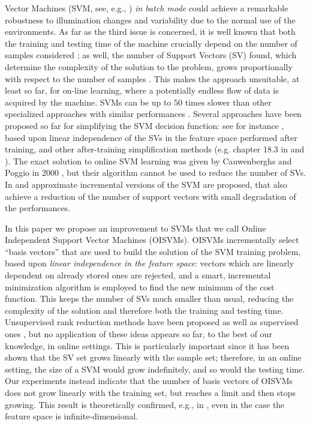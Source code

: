 Vector Machines (SVM, see, e.g., \cite{BGV92}) \emph{in batch mode}
could achieve a remarkable robustness to illumination changes and
variability due to the normal use of the environments. As far as the
third issue is concerned, it is well known that both the training and
testing time of the machine crucially depend on the number of samples
considered \cite{KeerthiCDC06}; as well, the number of Support Vectors
(SV) found, which determine the complexity of the solution to the
problem, grows proportionally with respect to the number of samples
\cite{Steinwart03}. This makes the approach unsuitable, at least so
far, for on-line learning, where a potentially endless flow of data is
acquired by the machine. SVMs can be up to $50$ times slower than
other specialized approaches with similar performances
\cite{BurgesS96}.
Several approaches have been proposed so far for simplifying the SVM decision function: see for instance
\cite{DownsGM01}, based upon linear independence of the SVs in the
feature space performed after training, and other after-training simplification methods (e.g. 
chapter 18.3 in \cite{SmolaS02} and \cite{nguyen2005}).
The exact
solution to online SVM learning was given by Cauwenberghs and Poggio
in 2000 \cite{CauwenberghsP00}, but their algorithm cannot be used to
reduce the number of SVs. In \cite{syed99incremental} and
\cite{pronobis:icvs06} approximate incremental
versions of the SVM are proposed, that also achieve a reduction of the
number of support vectors with small degradation of the performances.

In this paper we propose an improvement to SVMs that we call Online
Independent Support Vector Machines (OISVMs). OISVMs incrementally
select ``basis vectors'' that are used to build the solution of the
SVM training problem, based upon \emph{linear independence in the
feature space}: vectors which are linearly dependent on already stored
ones are rejected, and a smart, incremental minimization algorithm is
employed to find the new minimum of the cost function. This keeps the
number of SVs much smaller than usual, reducing the complexity of the
solution and therefore both the training and testing time. 
Unsupervised rank reduction methods have been proposed
\cite{Baudat03} as well as supervised ones \cite{BachJordan2005}, but
no application of these ideas appears so far, to the best of our
knowledge, in online settings.
This is particularly important since it
has been shown \cite{Steinwart03} that the SV set grows linearly with
the sample set; therefore, in an online setting, the size of a SVM
would grow indefinitely, and so would the testing time. 
Our experiments instead indicate that the number of basis
vectors of OISVMs does not grow linearly with the training set, but
reaches a limit and then stops growing. This result is theoretically
confirmed, e.g., in \cite{engel2004}, even in the case the feature
space is infinite-dimensional.

